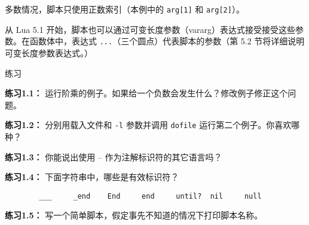 多数情况，脚本只使用正数索引（本例中的 \verb|arg[1]| 和 \verb|arg[2]|）。

从 Lua 5.1 开始，脚本也可以通过可变长度参数（vararg）表达式接受接受这些参数。在函数体中，表达式 \verb|...|（三个圆点）代表脚本的参数（第 5.2 节将详细说明可变长度参数表达式。）

\vspace{2em}

\begin{center}
        {\Large 练习}
\end{center}

\vspace{1em}

{\textbf{练习1.1：}} 运行阶乘的例子。如果给一个负数会发生什么？修改例子修正这个问题。

{\textbf{练习1.2：}} 分别用载入文件和 \verb|-l| 参数并调用 \verb|dofile| 运行第二个例子。你喜欢哪种？

{\textbf{练习1.3：}} 你能说出使用 -- 作为注解标识符的其它语言吗？

{\textbf{练习1.4：}} 下面字符串中，哪些是有效标识符？

\begin{verbatim}
        ___     _end    End     end     until?  nil     null
\end{verbatim}

{\textbf{练习1.5：}} 写一个简单脚本，假定事先不知道的情况下打印脚本名称。